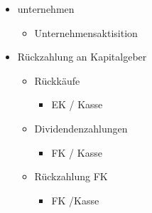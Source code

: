 \begin{itemize}
    \item unternehmen
    \begin{itemize}
        \item Unternehmensaktisition 
    \end{itemize}
    \item Rückzahlung an Kapitalgeber
    \begin{itemize}
        \item Rückkäufe
        \begin{itemize}
            \item EK / Kasse
        \end{itemize}
        \item Dividendenzahlungen
        \begin{itemize}
            \item FK / Kasse
        \end{itemize}
        \item Rückzahlung FK
        \begin{itemize}
            \item FK /Kasse
        \end{itemize}
    \end{itemize}
\end{itemize}